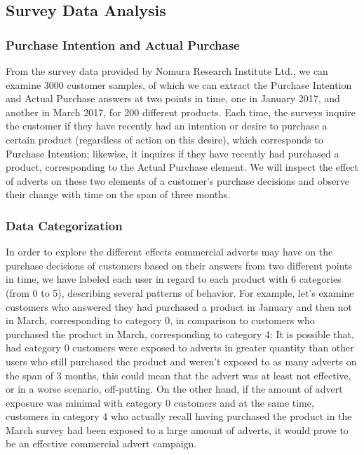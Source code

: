 \documentclass[review]{elsarticle}
\begin{document}
\subsection{Survey Data Analysis}
\label{survey_data_analysis}

\subsubsection{Purchase Intention and Actual Purchase}
\label{pi_and_ap}

From the survey data provided by Nomura Research Institute Ltd., we can examine 3000 customer samples, of which we can extract the Purchase Intention and Actual Purchase answers at two points in time, one in January 2017, and another in March 2017, for 200 different products. Each time, the surveys inquire the customer if they have recently had an intention or desire to purchase a certain product (regardless of action on this desire), which corresponds to Purchase Intention; likewise, it inquires if they have recently had purchased a product, corresponding to the Actual Purchase element. We will inspect the effect of adverts on these two elements of a customer's purchase decisions and observe their change with time on the span of three months.

\subsubsection{Data Categorization}
\label{data_cat}

In order to explore the different effects commercial adverts may have on the purchase decisions of customers based on their answers from two different points in time, we have labeled each user in regard to each product with 6 categories (from 0 to 5), describing several patterns of behavior. For example, let's examine customers who answered they had purchased a product in January and then not in March, corresponding to category 0, in comparison to customers who purchased the product in March, corresponding to category 4: It is possible that, had category 0 customers were exposed to adverts in greater quantity than other users who still purchased the product and weren't exposed to as many adverts on the span of 3 months, this could mean that the advert was at least not effective, or in a worse scenario, off-putting. On the other hand, if the amount of advert exposure was minimal with category 0 customers and at the same time, customers in category 4 who actually recall having purchased the product in the March survey had been exposed to a large amount of adverts, it would prove to be an effective commercial advert campaign.
\end{document}
